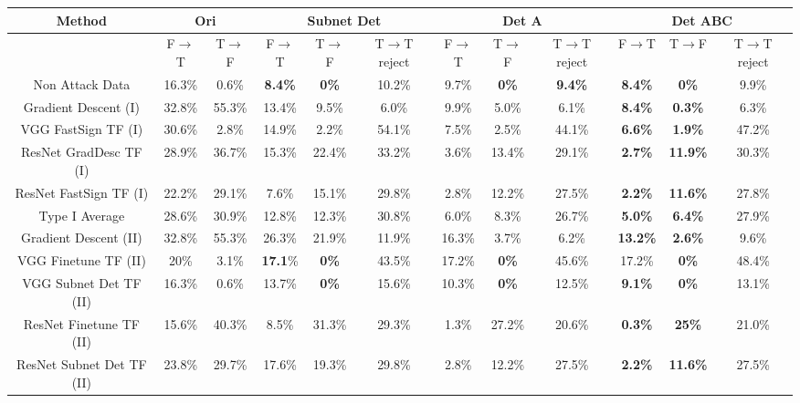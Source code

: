 \documentclass[10pt,twocolumn,letterpaper]{article}
\begin{document}
\begin{table*}[h!]
\begin{center}
\resizebox{1.0\textwidth}{!}
{
\begin{tabular}{  c | c | c || c | c | c | c | c | c | c | c | c }
  Method & \multicolumn{2}{c||}{Ori} & \multicolumn{3}{c|}{Subnet Det} & \multicolumn{3}{c|}{Det A} & \multicolumn{3}{c}{Det ABC} \\
  \hline
 & F$\rightarrow$T & T$\rightarrow$F & F$\rightarrow$T & T$\rightarrow$F & T$\rightarrow$T reject & F$\rightarrow$T & T$\rightarrow$F & T$\rightarrow$T reject & F$\rightarrow$T & T$\rightarrow$F & T$\rightarrow$T reject\\
  \hline
 Non Attack Data & 16.3\% & 0.6\% & \textbf{8.4\%} & \textbf{0\%} & 10.2\% & 9.7\% & \textbf{0\%} & \textbf{9.4\%} & \textbf{8.4\%} & \textbf{0\%} & 9.9\%\\
  \hline
 Gradient Descent (I)& 32.8\% & 55.3\% & 13.4\% & 9.5\% & 6.0\% & 9.9\% & 5.0\% & 6.1\% & \textbf{8.4\%} & \textbf{0.3\%} & 6.3\% \\
 VGG FastSign TF  (I) & 30.6\% & 2.8\% & 14.9\% & 2.2\% & 54.1\% & 7.5\% & 2.5\% & 44.1\% & \textbf{6.6\%} & \textbf{1.9\%} & 47.2\%\\
 ResNet GradDesc TF (I) & 28.9\%  & 36.7\% & 15.3\% & 22.4\% & 33.2\% & 3.6\% & 13.4\% & 29.1\% & \textbf{2.7\%} & \textbf{11.9\%} & 30.3\%\\
 ResNet FastSign TF (I) & 22.2\% & 29.1\% & 7.6\% & 15.1\% & 29.8\% & 2.8\% & 12.2\% & 27.5\% & \textbf{2.2\%} & \textbf{11.6\%} & 27.8\% \\
 Type I Average & 28.6\% & 30.9\% & 12.8\% & 12.3\% & 30.8\% & 6.0\% & 8.3\% & 26.7\% & \textbf{5.0\%} & \textbf{6.4\%} & 27.9\% \\
  \hline
 Gradient Descent (II)& 32.8\% & 55.3\% & 26.3\% & 21.9\% & 11.9\% & 16.3\% & 3.7\% & 6.2\% & \textbf{13.2\%} & \textbf{2.6\%} & 9.6\% \\
 VGG Finetune TF (II) & 20\% & 3.1\% & \textbf{17.1}\% & \textbf{0\%} & 43.5\% & 17.2\% & \textbf{0\%} & 45.6\% & 17.2\% & \textbf{0\%} & 48.4\% \\
VGG Subnet Det TF (II) &  16.3\% & 0.6\% & 13.7\% & \textbf{0\%} & 15.6\% & 10.3\% & \textbf{0\%} & 12.5\% & \textbf{9.1\%} & \textbf{0\%} & 13.1\%\\
 ResNet Finetune TF (II) & 15.6\% & 40.3\% & 8.5\% & 31.3\% & 29.3\% & 1.3\% & 27.2\% & 20.6\% & \textbf{0.3\%} & \textbf{25\%}  & 21.0\% \\
 ResNet Subnet Det TF (II) & 23.8\% & 29.7\% & 17.6\% & 19.3\% & 29.8\% & 2.8\% & 12.2\% & 27.5\% & \textbf{2.2\%} & \textbf{11.6\%} & 27.5\%\\

\end{tabular}}
\end{center}
\end{table*}
\end{document}
